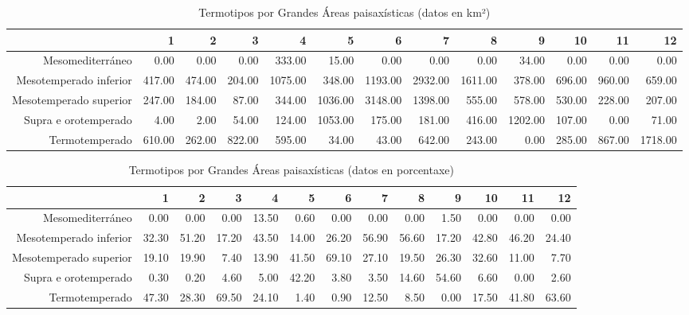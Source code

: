 \begin{table}[p]
\centering
\caption{Termotipos por Grandes Áreas paisaxísticas (datos en km²)} 
\label{xtaboa3}
\begin{tabular}{rrrrrrrrrrrrr}
  \hline
 & 1 & 2 & 3 & 4 & 5 & 6 & 7 & 8 & 9 & 10 & 11 & 12 \\ 
  \hline
Mesomediterráneo & 0.00 & 0.00 & 0.00 & 333.00 & 15.00 & 0.00 & 0.00 & 0.00 & 34.00 & 0.00 & 0.00 & 0.00 \\ 
  Mesotemperado inferior & 417.00 & 474.00 & 204.00 & 1075.00 & 348.00 & 1193.00 & 2932.00 & 1611.00 & 378.00 & 696.00 & 960.00 & 659.00 \\ 
  Mesotemperado superior & 247.00 & 184.00 & 87.00 & 344.00 & 1036.00 & 3148.00 & 1398.00 & 555.00 & 578.00 & 530.00 & 228.00 & 207.00 \\ 
  Supra e orotemperado & 4.00 & 2.00 & 54.00 & 124.00 & 1053.00 & 175.00 & 181.00 & 416.00 & 1202.00 & 107.00 & 0.00 & 71.00 \\ 
  Termotemperado & 610.00 & 262.00 & 822.00 & 595.00 & 34.00 & 43.00 & 642.00 & 243.00 & 0.00 & 285.00 & 867.00 & 1718.00 \\ 
   \hline
\end{tabular}
\end{table}
\begin{table}[p]
\centering
\caption{Termotipos por Grandes Áreas paisaxísticas (datos en porcentaxe)} 
\label{xtaboa3p}
\begin{tabular}{rrrrrrrrrrrrr}
  \hline
 & 1 & 2 & 3 & 4 & 5 & 6 & 7 & 8 & 9 & 10 & 11 & 12 \\ 
  \hline
Mesomediterráneo & 0.00 & 0.00 & 0.00 & 13.50 & 0.60 & 0.00 & 0.00 & 0.00 & 1.50 & 0.00 & 0.00 & 0.00 \\ 
  Mesotemperado inferior & 32.30 & 51.20 & 17.20 & 43.50 & 14.00 & 26.20 & 56.90 & 56.60 & 17.20 & 42.80 & 46.20 & 24.40 \\ 
  Mesotemperado superior & 19.10 & 19.90 & 7.40 & 13.90 & 41.50 & 69.10 & 27.10 & 19.50 & 26.30 & 32.60 & 11.00 & 7.70 \\ 
  Supra e orotemperado & 0.30 & 0.20 & 4.60 & 5.00 & 42.20 & 3.80 & 3.50 & 14.60 & 54.60 & 6.60 & 0.00 & 2.60 \\ 
  Termotemperado & 47.30 & 28.30 & 69.50 & 24.10 & 1.40 & 0.90 & 12.50 & 8.50 & 0.00 & 17.50 & 41.80 & 63.60 \\ 
   \hline
\end{tabular}
\end{table}
